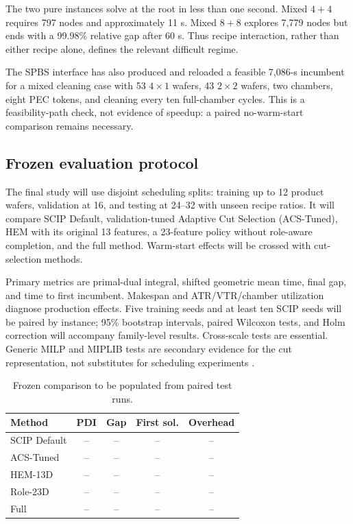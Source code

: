 \documentclass{ifacconf}
\begin{document}
The two pure instances solve at the root in less than one second. Mixed $4+4$ requires 797 nodes and approximately 11 s. Mixed $8+8$ explores 7,779 nodes but ends with a 99.98\% relative gap after 60 s. Thus recipe interaction, rather than either recipe alone, defines the relevant difficult regime.

The SPBS interface has also produced and reloaded a feasible 7,086-s incumbent for a mixed cleaning case with 53 $4\times1$ wafers, 43 $2\times2$ wafers, two chambers, eight PEC tokens, and cleaning every ten full-chamber cycles. This is a feasibility-path check, not evidence of speedup: a paired no-warm-start comparison remains necessary.

\subsection{Frozen evaluation protocol}

The final study will use disjoint scheduling splits: training up to 12 product wafers, validation at 16, and testing at 24--32 with unseen recipe ratios. It will compare SCIP Default, validation-tuned Adaptive Cut Selection (ACS-Tuned), HEM with its original 13 features, a 23-feature policy without role-aware completion, and the full method. Warm-start effects will be crossed with cut-selection methods.

Primary metrics are primal-dual integral, shifted geometric mean time, final gap, and time to first incumbent. Makespan and ATR/VTR/chamber utilization diagnose production effects. Five training seeds and at least ten SCIP seeds will be paired by instance; 95\% bootstrap intervals, paired Wilcoxon tests, and Holm correction will accompany family-level results. Cross-scale tests are essential. Generic MILP and MIPLIB tests are secondary evidence for the cut representation, not substitutes for scheduling experiments \citep{gleixner2021miplib}.

\begin{table}[t]
\begin{center}
\caption{Frozen comparison to be populated from paired test runs.}\label{tab:protocol}
\begin{tabular}{lcccc}
\toprule
Method & PDI & Gap & First sol. & Overhead\\
\midrule
SCIP Default & -- & -- & -- & --\\
ACS-Tuned & -- & -- & -- & --\\
HEM-13D & -- & -- & -- & --\\
Role-23D & -- & -- & -- & --\\
Full & -- & -- & -- & --\\
\bottomrule
\end{tabular}
\end{center}
\end{table}
\end{document}
